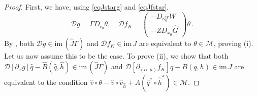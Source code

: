\documentclass[11pt]{amsart}
\renewcommand{\k}{\kappa}
\newcommand{\wG}{\widehat{G}}
\newcommand{\wB}{\widehat{B}}
\newcommand{\wJ}{\hat{J}}
\newcommand{\mM}{\mathcal{M}}
\newcommand{\mD}{\mathcal{D}}
\theoremstyle{definition}
\begin{document}
\begin{proof}
First, we have, using \eqref{eqJstarg} and \eqref{eqJfstar},
\[
\mD g = \Gamma D_{c_0}\theta, \quad \mD f_K=\left(\begin{array}{c}-D_{\k_0^W}W\\-ZD_{x_0}\wG \end{array}\right) \theta\,.
\]
By , both $\mD g \in \mathrm{im}\,(\wJ \Gamma)$ and $\mD f_K \in \mathrm{im}\,J$ are equivalent to $\theta \in \mM$, proving (i). Let us now assume this to be the case. To prove (ii), we show that both $\mD[\partial_x g]\hat{q} - \wB(\hat{q},\hat{h}) \in \mathrm{im}\,(\wJ \Gamma)$ and $\mD[\partial_{(\alpha, \mu)} f_K]q  - B(q,h) \in \mathrm{im}\,J$ are equivalent to the condition $\hat{v} \circ \theta - \hat{v} \circ \hat{v}_{\hat{h}} + A(\hat{q}^* \circ \hat{h}^*) \in \mM$.


\end{proof}
\end{document}
